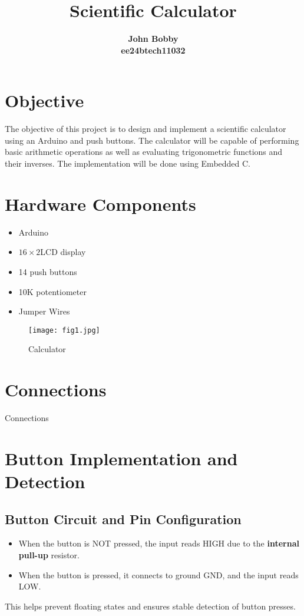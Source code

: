 \documentclass[12pt]{article}
\title{\textbf{Scientific Calculator}}
\author{\textbf{John Bobby}\\ \textbf{ee24btech11032}}
\date{}
\begin{document}
\maketitle
\section{Objective}
The objective of this project is to design and implement a scientific calculator using an Arduino and push buttons. The calculator will be capable of performing basic arithmetic operations as well as evaluating trigonometric functions and their inverses. The implementation will be done using Embedded C.

\section{Hardware Components}
\begin{itemize}
    \item Arduino
    \item $16 \times 2$LCD display
    \item 14 push buttons
    \item 10K potentiometer
    \item Jumper Wires
\end{itemize}
\begin{figure}[H]
    \centering
    \texttt{[image: fig1.jpg]}
    \caption{Calculator}
    \label{fig:enter-label}
\end{figure}
 \section{Connections}
 \begin{table}[H]
     \centering
    
     \caption{Connections}
     \label{tab:my_label}
 \end{table}

 \section{Button Implementation and Detection}


\subsection{Button Circuit and Pin Configuration}
\begin{itemize}
    \item When the button is NOT pressed, the input reads HIGH due to the \textbf{internal pull-up} resistor.
    \item When the button is pressed, it connects to ground GND, and the input reads LOW.
\end{itemize}
This helps prevent floating states and ensures stable detection of button presses.
\end{document}

